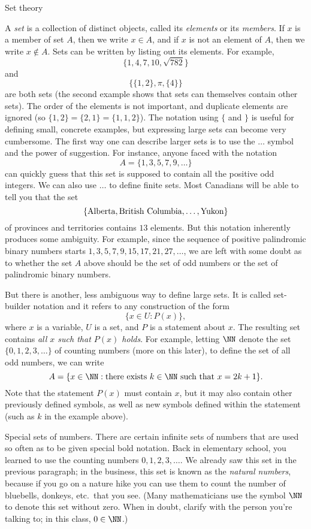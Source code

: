 \advsect Set theory

A {\it set} is a collection of distinct objects, called its {\it elements} or its {\it members}. If
$x$ is a member of set $A$, then we write $x\in A$, and if $x$ is not an element of $A$,
then we write $x\notin A$.
Sets can be written by listing out its elements. For example,
$$\bigl\{1,4,7,10,\sqrt{782}\bigr\}$$
and
$$\bigl\{\{1,2\}, \pi, \{4\}\bigr\}$$
are both sets (the second example shows that sets can themselves contain other sets). The order of the elements
is not important, and duplicate elements are ignored (so $\{1,2\} = \{2,1\} = \{1,1,2\}$).
The notation using $\{$ and $\}$
is useful for defining small, concrete examples, but expressing large sets can become
very cumbersome. The first way one can describe larger sets is to use the $\ldots$ symbol and the power of
suggestion. For instance, anyone faced with the notation
$$A = \{1,3,5,7,9,\ldots\}$$
can quickly guess that this set is supposed to contain all the positive odd integers. We can also use $\ldots$
to define finite sets. Most Canadians will be able to tell you that the set
$$\{\hbox{\rm Alberta}, \hbox{\rm British Columbia}, \ldots, \hbox{\rm Yukon}\}$$
of provinces and territories contains $13$ elements.
But this notation inherently produces some ambiguity. For example, since the sequence of positive palindromic
binary numbers starts $1,3,5,7,9,15,17,21,27,\ldots$,
we are left with some doubt as to whether the set $A$ above should be the set of odd numbers or the set of
palindromic binary numbers.

But there is another, less ambiguous way to define large sets. It is called set-builder notation
and it refers to any construction of the form
$$\bigl\{x \in U : P(x)\bigr\},$$
where $x$ is a variable, $U$ is a set,
and $P$ is a statement about $x$. The resulting set contains {\sl all $x$ such that $P(x)$
holds}. For example, letting $\NN$ denote the set $\{0,1,2,3,\ldots\}$ of counting numbers (more on this later),
to define the set of all odd numbers, we can write
$$A = \{ x\in \NN : \hbox{there exists}\ k\in \NN\ \hbox{such that}\ x = 2k + 1\}.$$
Note that the statement $P(x)$ must contain $x$, but it may also contain other previously defined symbols, as well
as new symbols defined within the statement (such as $k$ in the example above).

\medskip\boldlabel Special sets of numbers.
There are certain infinite sets of numbers that are used so often as to be given special bold notation.
Back in elementary school, you learned to use the counting numbers $0, 1, 2, 3, \ldots$. We already saw this
set in the previous paragraph; in the business,
this set is known as the {\it natural numbers}, because if you go on a nature hike you
can use them to count the number of bluebells, donkeys, etc.~that you see.
(Many mathematicians use the symbol $\NN$ to denote this set without zero. When in doubt,
clarify with the person you're talking to; in this class, $0\in \NN$.)

